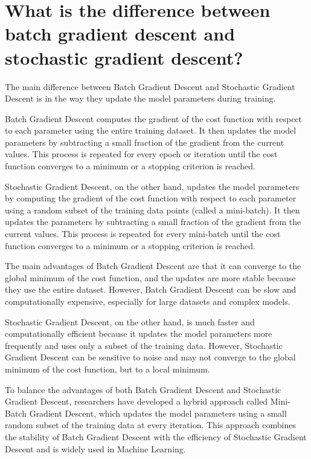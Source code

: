 \section{What is the difference between batch gradient descent and stochastic gradient descent?}
The main difference between Batch Gradient Descent and Stochastic Gradient Descent is in the way they update the model parameters during training.

Batch Gradient Descent computes the gradient of the cost function with respect to each parameter using the entire training dataset. It then updates the model parameters by subtracting a small fraction of the gradient from the current values. This process is repeated for every epoch or iteration until the cost function converges to a minimum or a stopping criterion is reached.

Stochastic Gradient Descent, on the other hand, updates the model parameters by computing the gradient of the cost function with respect to each parameter using a random subset of the training data points (called a mini-batch). It then updates the parameters by subtracting a small fraction of the gradient from the current values. This process is repeated for every mini-batch until the cost function converges to a minimum or a stopping criterion is reached.

The main advantages of Batch Gradient Descent are that it can converge to the global minimum of the cost function, and the updates are more stable because they use the entire dataset. However, Batch Gradient Descent can be slow and computationally expensive, especially for large datasets and complex models.

Stochastic Gradient Descent, on the other hand, is much faster and computationally efficient because it updates the model parameters more frequently and uses only a subset of the training data. However, Stochastic Gradient Descent can be sensitive to noise and may not converge to the global minimum of the cost function, but to a local minimum.

To balance the advantages of both Batch Gradient Descent and Stochastic Gradient Descent, researchers have developed a hybrid approach called Mini-Batch Gradient Descent, which updates the model parameters using a small random subset of the training data at every iteration. This approach combines the stability of Batch Gradient Descent with the efficiency of Stochastic Gradient Descent and is widely used in Machine Learning.

